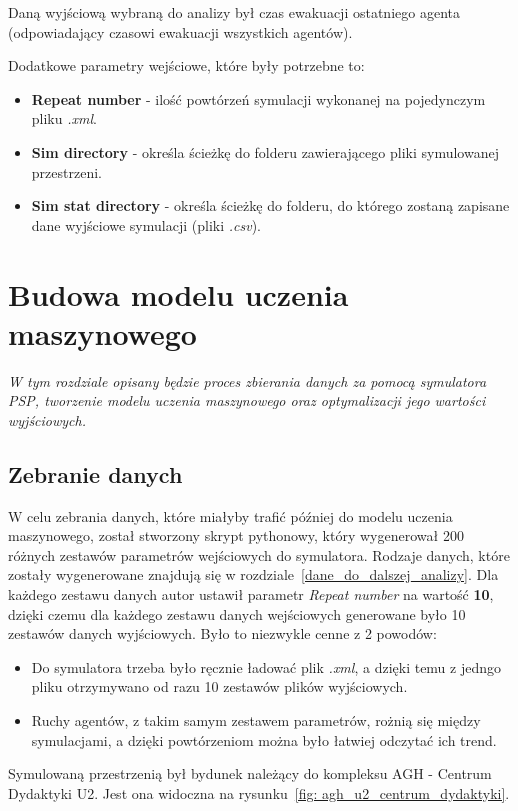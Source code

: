\documentclass[12pt]{aghdpl}
\begin{document}
		Daną wyjściową wybraną do analizy był czas ewakuacji ostatniego agenta (odpowiadający czasowi ewakuacji wszystkich agentów).
		
		Dodatkowe parametry wejściowe, które były potrzebne to:
		\begin{itemize}
		\item \textbf{Repeat number} - ilość powtórzeń symulacji wykonanej na pojedynczym pliku \textit{.xml}.
		\item \textbf{Sim directory} - określa ścieżkę do folderu zawierającego pliki symulowanej przestrzeni.
		\item \textbf{Sim stat directory} - określa ścieżkę do folderu, do którego zostaną zapisane dane wyjściowe symulacji (pliki \textit{.csv}).
		\end{itemize}
		
	\chapter{Budowa modelu uczenia maszynowego}
	\textit{W tym rozdziale opisany będzie proces zbierania danych za pomocą symulatora PSP, tworzenie modelu uczenia maszynowego oraz optymalizacji jego wartości wyjściowych.}
	
		\section{Zebranie danych} \label{zebranie_danych}
		W celu zebrania danych, które miałyby trafić później do modelu uczenia maszynowego, został stworzony skrypt pythonowy, który wygenerował 200 różnych zestawów parametrów wejściowych do symulatora. Rodzaje danych, które zostały wygenerowane znajdują się w rozdziale~\ref{dane_do_dalszej_analizy}. Dla każdego zestawu danych autor ustawił parametr \textit{Repeat number} na wartość \textbf{10}, dzięki czemu dla każdego zestawu danych wejściowych generowane było 10 zestawów danych wyjściowych. Było to niezwykle cenne z 2 powodów:
		\begin{itemize}
		\item Do symulatora trzeba było ręcznie ładować plik \textit{.xml}, a dzięki temu z jedngo pliku otrzymywano od razu 10 zestawów plików wyjściowych.
		\item Ruchy agentów, z takim samym zestawem parametrów, rożnią się między symulacjami, a dzięki powtórzeniom można było łatwiej odczytać ich trend.
		\end{itemize}
		
		Symulowaną przestrzenią był bydunek należący do kompleksu AGH - Centrum Dydaktyki U2. Jest ona widoczna na rysunku~\ref{fig: agh_u2_centrum_dydaktyki}.
		
\end{document}
